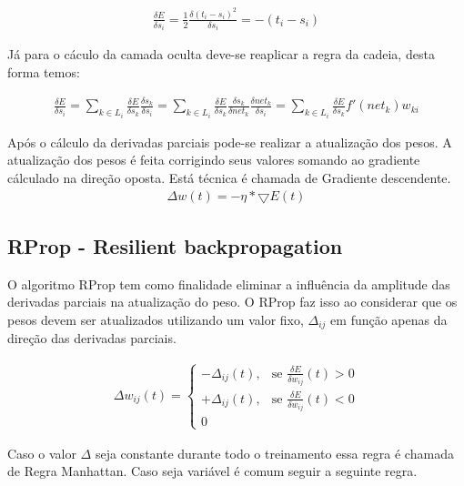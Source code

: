 \documentclass[
	article,			%
	11pt,				%
	oneside,			%
	a4paper,			%
	english,			%
	brazil,				%
	sumario=tradicional
	]{abntex2}
\begin{document}
\begin{align}
\frac{\delta E}{\delta s_i}=
\frac{1}{2}\frac{\delta (t_i-s_i)^2}{\delta s_i}=-(t_i-s_i)
\end{align}

Já para o cáculo da camada oculta deve-se reaplicar a regra da cadeia, desta
forma temos:

\begin{align}
\frac{\delta E}{\delta s_i}=
\sum_{k \in L_i} \frac{\delta E}{\delta s_k} \frac{\delta s_k}{\delta s_i}=
\sum_{k \in L_i} \frac{\delta E}{\delta s_k} \frac{\delta s_k}{\delta net_k}
\frac{\delta net_k}{\delta s_i}=
\sum_{k \in L_i} \frac{\delta E}{\delta s_k} f'(net_k)w_{ki}
\end{align}

Após o cálculo da derivadas parciais pode-se realizar a atualização dos pesos. A
atualização dos pesos é feita corrigindo seus valores somando ao gradiente
cálculado na direção oposta. Está técnica é chamada de Gradiente descendente.
\begin{align}
\Delta w(t)=-\eta * \bigtriangledown E(t)
\end{align}

\subsection{RProp - Resilient backpropagation}
O algoritmo RProp tem como finalidade eliminar a influência da amplitude das
derivadas parciais na atualização do peso. O RProp faz isso ao considerar que os
pesos devem ser atualizados utilizando um valor fixo, $\Delta_{ij}$ em função
apenas da direção das derivadas parciais.

\begin{align}
\Delta w_{ij}(t) = 
\begin{cases} 
		-\Delta_{ij}(t), & \mbox{se } \frac{\delta E}{\delta w_{ij}}(t)>0 \\ 
		+\Delta_{ij}(t), & \mbox{se } \frac{\delta E}{\delta w_{ij}}(t)<0 \\
		0
\end{cases}
\end{align}

Caso o valor $\Delta$ seja constante durante todo o treinamento essa regra é
chamada de Regra Manhattan.
Caso seja variável é comum seguir a seguinte regra.
\end{document}
